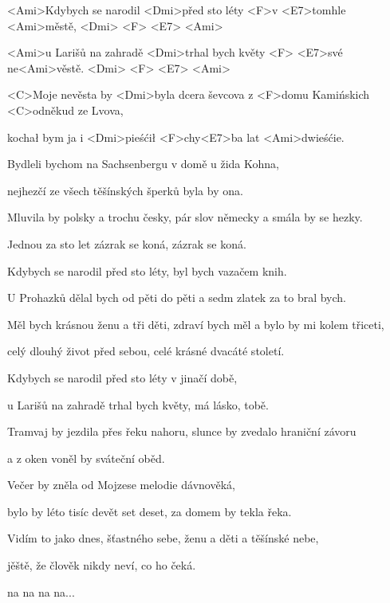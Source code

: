 

\zs
<Ami>Kdybych se narodil <Dmi>před sto léty
<F>v <E7>tomhle <Ami>městě, <Dmi> <F> <E7> <Ami>

<Ami>u Larišů na zahradě <Dmi>trhal bych květy <F>
<E7>své ne<Ami>věstě. <Dmi> <F> <E7> <Ami>

<C>Moje nevěsta by <Dmi>byla dcera ševcova
z <F>domu Kamińskich <C>odněkud ze Lvova,

kochał bym ja i <Dmi>pieśćił <F>chy<E7>ba lat <Ami>dwieśćie.
\ks

\zs
Bydleli bychom na Sachsenbergu v domě u žida Kohna,

nejhezčí ze všech těšínských šperků byla by ona.

Mluvila by polsky a trochu česky,
pár slov německy a smála by se hezky.

Jednou za sto let zázrak se koná, zázrak se koná.
\ks

\zs
Kdybych se narodil před sto léty, byl bych vazačem knih.

U Prohazků dělal bych od pěti do pěti a sedm zlatek za to bral bych.

Měl bych krásnou ženu a tři děti,
zdraví bych měl a bylo by mi kolem třiceti,

celý dlouhý život před sebou, celé krásné dvacáté století.
\ks

\zs
Kdybych se narodil před sto léty v jinačí době,

u Larišů na zahradě trhal bych květy, má lásko, tobě.

Tramvaj by jezdila přes řeku nahoru,
slunce by zvedalo hraniční závoru

a z oken voněl by sváteční oběd.
\ks

\zs
Večer by zněla od Mojzese melodie dávnověká,

bylo by léto tisíc devět set deset, za domem by tekla řeka.

Vidím to jako dnes, šťastného sebe,
ženu a děti a těšínské nebe,

jěště, že člověk nikdy neví, co ho čeká.

na na na na...
\ks

\kp
